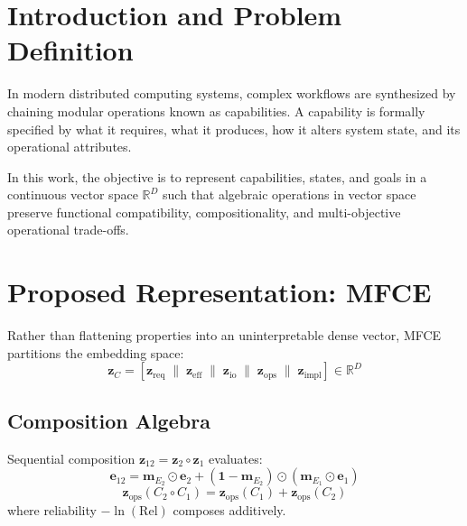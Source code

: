 \documentclass[10pt,journal,compsoc]{IEEEtran}
\begin{document}
\section{Introduction and Problem Definition}
In modern distributed computing systems, complex workflows are synthesized by chaining modular operations known as capabilities. A capability is formally specified by what it requires, what it produces, how it alters system state, and its operational attributes.

In this work, the objective is to represent capabilities, states, and goals in a continuous vector space $\mathbb{R}^D$ such that algebraic operations in vector space preserve functional compatibility, compositionality, and multi-objective operational trade-offs.

\section{Proposed Representation: MFCE}
Rather than flattening properties into an uninterpretable dense vector, MFCE partitions the embedding space:
\begin{equation}
\mathbf{z}_C = [\mathbf{z}_{\text{req}} \;\|\; \mathbf{z}_{\text{eff}} \;\|\; \mathbf{z}_{\text{io}} \;\|\; \mathbf{z}_{\text{ops}} \;\|\; \mathbf{z}_{\text{impl}}] \in \mathbb{R}^D
\end{equation}

\subsection{Composition Algebra}
Sequential composition $\mathbf{z}_{12} = \mathbf{z}_2 \circ \mathbf{z}_1$ evaluates:
\begin{equation}
\mathbf{e}_{12} = \mathbf{m}_{E_2} \odot \mathbf{e}_2 + (\mathbf{1} - \mathbf{m}_{E_2}) \odot (\mathbf{m}_{E_1} \odot \mathbf{e}_1)
\end{equation}
\begin{equation}
\mathbf{z}_{\text{ops}}(C_2 \circ C_1) = \mathbf{z}_{\text{ops}}(C_1) + \mathbf{z}_{\text{ops}}(C_2)
\end{equation}
where reliability $-\ln(\text{Rel})$ composes additively.
\end{document}

